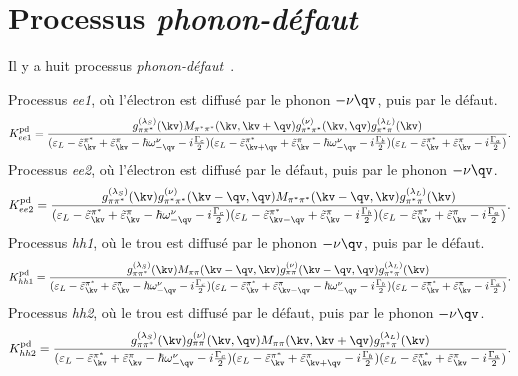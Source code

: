\section{Processus \textit{phonon-défaut}}
Il y a huit processus \textit{phonon-défaut}~\cite{venezuelaTheoryDoubleresonantRaman2011}.

\noindent
Processus \textit{ee1}, où l'électron est diffusé par le phonon $-\nu\qv$, puis par le défaut.
\begin{equation}
    K_{ee1}^{\text{pd}} = \frac{g^{(\lambda_S)}_{\pi\pi^*}(\kv)M_{\pi^*\pi^*}(\kv,\kv+\qv)g^{(\nu)}_{\pi^*\pi^*}(\kv,\qv)g_{\pi^*\pi}^{(\lambda_L)}(\kv)}{(\varepsilon_L-\tilde{\varepsilon}^{\pi^*}_\kv+\tilde{\varepsilon}^\pi_\kv-\hbar\omega_{-\qv}^\nu-i\frac{\Gamma_c}{2})(\varepsilon_L-\tilde{\varepsilon}_{\kv+\qv}^{\pi^*}+\tilde{\varepsilon}_\kv^\pi-\hbar\omega_{-\qv}^\nu-i\frac{\Gamma_b}{2})(\varepsilon_L-\tilde{\varepsilon}_\kv^{\pi^*}+\tilde{\varepsilon}_\kv^\pi-i\frac{\Gamma_a}{2})}\label{eqn:pd_ee1}.
\end{equation}
Processus \textit{ee2}, où l'électron est diffusé par le défaut, puis par le phonon $-\nu\qv$.
\begin{equation}
        K_{ee2}^{\text{pd}} = \frac{g^{(\lambda_S)}_{\pi\pi^*}(\kv)g^{(\nu)}_{\pi^*\pi^*}(\kv-\qv,\qv)M_{\pi^*\pi^*}(\kv-\qv,\kv)g_{\pi^*\pi}^{(\lambda_L)}(\kv)}{(\varepsilon_L-\tilde{\varepsilon}_\kv^{\pi^*}+\tilde{\varepsilon}_\kv^\pi-\hbar\omega_{-\qv}^\nu-i\frac{\Gamma_c}{2})(\varepsilon_L-\tilde{\varepsilon}_{\kv-\qv}^{\pi^*}+\tilde{\varepsilon}_\kv^\pi-i\frac{\Gamma_b}{2})(\varepsilon_L-\tilde{\varepsilon}_\kv^{\pi^*}+\tilde{\varepsilon}_{\kv}^\pi-i\frac{\Gamma_a}{2})}\label{eqn:pd_ee2}.
\end{equation}
Processus \textit{hh1}, où le trou est diffusé par le phonon $-\nu\qv$, puis par le défaut.
\begin{equation}
        K_{hh1}^{\text{pd}} = \frac{g^{(\lambda_S)}_{\pi\pi^*}(\kv)M_{\pi\pi}(\kv-\qv, \kv)g_{\pi\pi}^{(\nu)}(\kv-\qv,\qv)g_{\pi^*\pi}^{(\lambda_L)}(\kv)}{(\varepsilon_L-\tilde{\varepsilon}_\kv^{\pi^*}+\tilde{\varepsilon}_\kv^\pi-\hbar\omega_{-\qv}^\nu-i\frac{\Gamma_c}{2})(\varepsilon_L-\tilde{\varepsilon}_{\kv}^{\pi^*}+\tilde{\varepsilon}_{\kv-\qv}^\pi-\hbar\omega_{-\qv}^\nu-i\frac{\Gamma_b}{2})(\varepsilon_L-\tilde{\varepsilon}_\kv^{\pi^*}+\tilde{\varepsilon}_{\kv}^\pi-i\frac{\Gamma_a}{2})}\label{eqn:pd_hh1}.
\end{equation}
Processus \textit{hh2}, où le trou est diffusé par le défaut, puis par le phonon $-\nu\qv$.
\begin{equation}
        K_{hh2}^{\text{pd}} = \frac{g^{(\lambda_S)}_{\pi\pi^*}(\kv)g^{(\nu)}_{\pi\pi}(\kv,\qv)M_{\pi\pi}(\kv,\kv+\qv)g_{\pi^*\pi}^{(\lambda_L)}(\kv)}{(\varepsilon_L-\tilde{\varepsilon}_\kv^{\pi^*}+\tilde{\varepsilon}_\kv^\pi-\hbar\omega_{-\qv}^\nu-i\frac{\Gamma_c}{2})(\varepsilon_L-\tilde{\varepsilon}_{\kv}^{\pi^*}+\tilde{\varepsilon}_{\kv+\qv}^\pi-i\frac{\Gamma_b}{2})(\varepsilon_L-\tilde{\varepsilon}_\kv^{\pi^*}+\tilde{\varepsilon}_{\kv}^\pi-i\frac{\Gamma_a}{2})}\label{eqn:pd_hh2}.
\end{equation}
